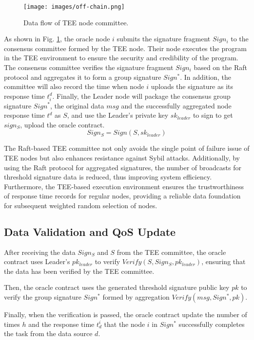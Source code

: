 \documentclass[paper]{ieice}
\begin{document}
\begin{figure}[h!]
    \centering
    \texttt{[image: images/off-chain.png]}
    \caption{Data flow of TEE node committee.}
    \label{fig:TEE}
\end{figure}

As shown in Fig. \ref{fig:TEE}, the oracle node $i$ submits the signature fragment $Sign_i$ to the consensus committee formed by the TEE node. Their node executes the program in the TEE environment \cite{costan2016intel,hua2017vtz} to ensure the security and credibility of the program. The consensus committee verifies the signature fragment $Sign_i$ based on the Raft protocol \cite{ongaro2014search} and aggregates it to form a group signature $Sign^*$. In addition, the committee will also record the time when node $i$ uploads the signature as its response time $t^d_i$. Finally, the Leader node will package the consensus group signature $Sign^*$, the original data $msg$ and the successfully aggregated node response time $t^d$ as $S$, and use the Leader's private key $sk_{leader}$ to sign to get $sign_S$, upload the oracle contract.
\begin{equation}
    Sign_S = Sign(S,sk_{leader})
\end{equation}

The Raft-based TEE committee not only avoids the single point of failure issue of TEE nodes but also enhances resistance against Sybil attacks. Additionally, by using the Raft protocol for aggregated signatures, the number of broadcasts for threshold signature data is reduced, thus improving system efficiency. Furthermore, the TEE-based execution environment ensures the trustworthiness of response time records for regular nodes, providing a reliable data foundation for subsequent weighted random selection of nodes.


\subsection{Data Validation and QoS Update}

After receiving the data $Sign_S$ and $S$ from the TEE committee, the oracle contract uses Leader's $pk_{leader}$ to verify $Verify(S, Sign_S,pk_{leader})$, ensuring that the data has been verified by the TEE committee.

Then, the oracle contract uses the generated threshold signature public key $pk$ to verify the group signature $Sign^*$ formed by aggregation $Verify(msg,Sign^*,pk)$.

Finally, when the verification is passed, the oracle contract update the number of times $h$ and the response time $t_d^i$ that the node $i$ in $Sign^*$ successfully completes the task from the data source $d$.
\end{document}
